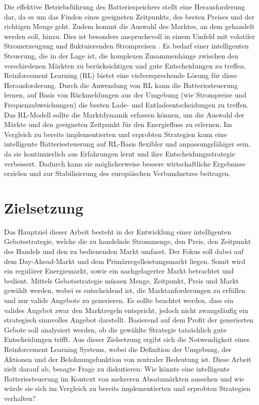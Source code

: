 \documentclass[a4paper, 11pt]{article}
\begin{document}
Die effektive Betriebsführung des Batteriespeichers stellt eine Herausforderung dar, da es um das Finden eines geeigneten Zeitpunkts, des besten Preises und der richtigen Menge geht. Zudem kommt die Auswahl des Marktes, an dem gehandelt werden soll, hinzu. Dies ist besonders anspruchsvoll in einem Umfeld mit volatiler Stromerzeugung und fluktuierenden Strompreisen \cite{grasl_evaluating_2014}. Es bedarf einer intelligenten Steuerung, die in der Lage ist, die komplexen Zusammenhänge zwischen den verschiedenen Märkten zu berücksichtigen und gute Entscheidungen zu treffen. Reinforcement Learning (RL) bietet eine vielversprechende Lösung für diese Herausforderung. Durch die Anwendung von RL kann die Batteriesteuerung lernen, auf Basis von Rückmeldungen aus der Umgebung (wie Strompreise und Frequenzabweichungen) die besten Lade- und Entladeentscheidungen zu treffen. Das RL-Modell sollte die Marktdynamik erfassen können, um die Auswahl der Märkte und den geeigneten Zeitpunkt für den Energiefluss zu erlernen. Im Vergleich zu bereits implementierten und erprobten Strategien kann eine intelligente Batteriesteuerung auf RL-Basis flexibler und anpassungsfähiger sein, da sie kontinuierlich aus Erfahrungen lernt und ihre Entscheidungsstrategie verbessert. Dadurch kann sie möglicherweise bessere wirtschaftliche Ergebnisse erzielen und zur Stabilisierung des europäischen Verbundnetzes beitragen. 



\section{Zielsetzung}
\label{objective}
Das Hauptziel dieser Arbeit besteht in der Entwicklung einer intelligenten Gebotsstrategie, welche die zu handelnde Strommenge, den Preis, den Zeitpunkt des Handels und den zu bedienenden Markt umfasst. Der Fokus soll dabei auf dem Day-Ahead-Markt und dem Primärregelleistungsmarkt liegen. Somit wird ein regulärer Energiemarkt, sowie ein nachgelagerter Markt betrachtet und bedient.
Mittels Gebotsstrategie müssen Menge, Zeitpunkt, Preis und Markt gewählt werden, wobei es entscheidend ist, die Marktanforderungen zu erfüllen und nur valide Angebote zu generieren. Es sollte beachtet werden, dass ein valides Angebot zwar den Marktregeln entspricht, jedoch nicht zwangsläufig ein strategisch sinnvolles Angebot darstellt. Basierend auf dem Profit der generierten Gebote soll analysiert werden, ob die gewählte Strategie tatsächlich gute Entscheidungen trifft. Aus dieser Zielsetzung ergibt sich die Notwendigkeit eines Reinforcement Learning Systems, wobei die Definition der Umgebung, der Aktionen und der Belohnungsfunktion von zentraler Bedeutung ist. Diese Arbeit zielt darauf ab, besagte Frage zu diskutieren: Wie könnte eine intelligente Batteriesteuerung im Kontext von mehreren Absatzmärkten aussehen und wie würde sie sich im Vergleich zu bereits implementierten und erprobten Strategien verhalten?
\end{document}
